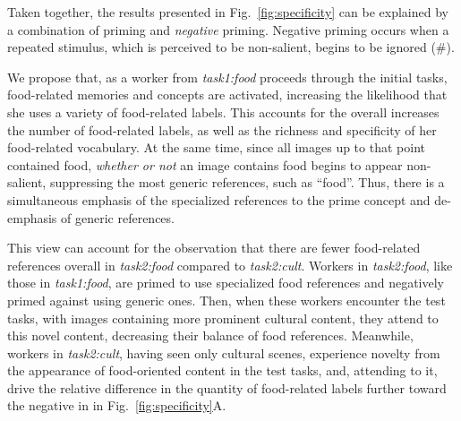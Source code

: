 \documentclass[12pt]{article}
\begin{document}
Taken together, the results presented in Fig.~\ref{fig:specificity} can 
be explained by a combination of priming and  \textit{negative} priming.
Negative priming occurs when a repeated stimulus, which is perceived to be
non-salient, begins to be ignored (\#).  

We propose that, as a worker from \textit{task1:food} proceeds through the 
initial tasks, food-related memories and concepts are activated, increasing 
the likelihood that she uses a variety of food-related labels.  This accounts
for the overall increases the number of food-related labels, as well as the 
richness and specificity of her food-related vocabulary.  At the same time,
since all images up to that point contained food, \textit{whether or not}
an image contains food begins to appear non-salient, suppressing the most 
generic references, such as ``food''.  Thus, there is a simultaneous emphasis of the specialized 
references to the prime concept and de-emphasis of generic references. 

This view can account for the observation that there are fewer
food-related references overall in \textit{task2:food} compared to 
\textit{task2:cult}.  Workers in \textit{task2:food}, like those in 
\textit{task1:food}, are primed to use
specialized food references and negatively primed against using generic
ones.  Then, when these workers encounter the test tasks, with images 
containing more prominent cultural content, they attend to this novel content, 
decreasing their balance of food references.  
Meanwhile, workers in \textit{task2:cult}, having seen only cultural scenes,
experience novelty from the appearance of food-oriented content in the test 
tasks, and, attending to it, drive the relative difference in the quantity of 
food-related labels further toward the negative in in 
Fig.~\ref{fig:specificity}A.
\end{document}

